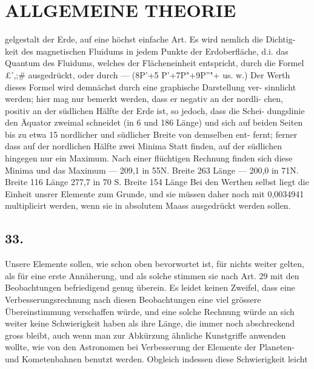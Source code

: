 \documentclass[12pt,a4paper]{article}
\begin{document}
\newpage


\section*{ALLGEMEINE THEORIE}
gelgestalt der Erde, auf eine höchst einfache Art. Es wird nemlich die Dichtig- keit des magnetischen Fluidums in jedem Punkte der Erdoberfläche, d.i. das Quantum des Fluidums, welches der Flächeneinheit entspricht, durch die Formel \pounds{}',;\# ausgedrückt, oder durch --- (8P'+5 P'+7P"+9P''"+ us. w.) Der Werth dieses Formel wird demnächst durch eine graphische Darstellung ver- sinnlicht werden; hier mag nur bemerkt werden, dass er negativ an der nordli- chen, positiv an der südlichen Hälfte der Erde ist, so jedoch, dass die Schei- dungslinie den Äquator zweimal schneidet (in 6\textdegree{} und 186\textdegree{} Länge) und sich auf beiden Seiten bis zu etwa 15\textdegree{} nordlicher und südlicher Breite von demselben ent- fernt; ferner dass auf der nordlichen Hälfte zwei Minima Statt finden, auf der südlichen hingegen nur ein Maximum. Nach einer flüchtigen Rechnung finden sich diese Minima und das Maximum --- 209,1 in 55\textdegree{}N. Breite 263\textdegree{} Länge --- 200,0 in 71\textdegree{}N. Breite 116\textdegree{} Länge 277,7 in 70\textdegree{} S. Breite 154\textdegree{} Länge Bei den Werthen selbst liegt die Einheit unsrer Elemente zum Grunde, und sie müssen daher noch mit 0,0034941 multiplicirt werden, wenn sie in absolutem Maass ausgedrückt werden sollen.

\subsection*{33.}
Unsere Elemente sollen, wie schon oben bevorwortet ist, für nichts weiter gelten, als für eine erste Annäherung, und als solche stimmen sie nach Art. 29 mit den Beobachtungen befriedigend genug überein. Es leidet keinen Zweifel, dass eine Verbesserungsrechnung nach diesen Beobachtungen eine viel grössere Übereinstimmung verschaffen würde, und eine solche Rechnung würde an sich weiter keine Schwierigkeit haben als ihre Länge, die immer noch abschreckend gross bleibt, auch wenn man zur Abkürzung ähnliche Kunstgriffe anwenden wollte, wie von den Astronomen bei Verbesserung der Elemente der Planeten- und Kometenbahnen benutzt werden. Obgleich indessen diese Schwierigkeit leicht


\newpage
\end{document}
